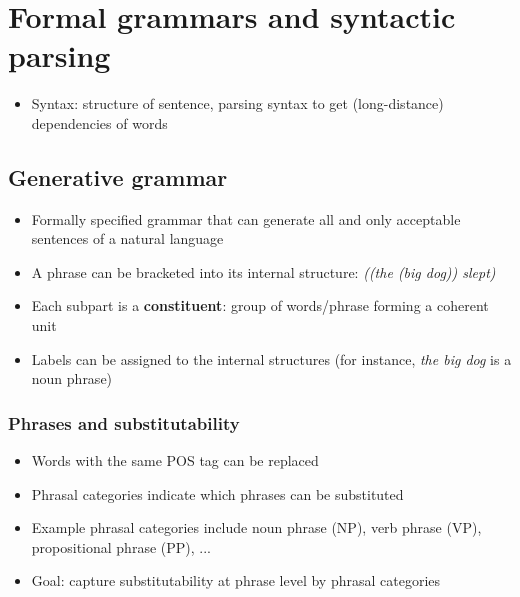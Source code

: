 \section{Formal grammars and syntactic parsing}
\begin{itemize}
	\item Syntax: structure of sentence, parsing syntax to get (long-distance) dependencies of words
\end{itemize}

\subsection{Generative grammar}
\begin{itemize}
	\item Formally specified grammar that can generate all and only acceptable sentences of a natural language
	\item A phrase can be bracketed into its internal structure: \textit{((the (big dog)) slept)}
	\item Each subpart is a \textbf{constituent}: group of words/phrase forming a coherent unit 
	\item Labels can be assigned to the internal structures (for instance, \textit{the big dog} is a noun phrase)
\end{itemize}
\subsubsection{Phrases and substitutability}
\begin{itemize}
	\item Words with the same POS tag can be replaced
	\item Phrasal categories indicate which phrases can be substituted
	\item Example phrasal categories include noun phrase (NP), verb phrase (VP), propositional phrase (PP), ...
	\item Goal: capture substitutability at phrase level by phrasal categories
\end{itemize}
